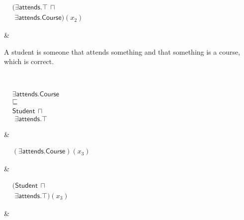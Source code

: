 \documentclass{amsart}
\newcommand\tableEntailmentSpacing{2.5cm}
\newcommand\tableExamplarSpacing{3.5cm}
\newcommand\tableCommentSpacing{4cm}
\newcommand\tableEquationIndent{4pt}
\begin{document}
\begin{table}
\begin{center}
\begin{tabular}
\begin{minipage}{\tableExamplarSpacing}
				\vspace{2pt}
				$\begin{aligned}
				&(\exists \mathsf{attends}.\top\hspace{2pt} \sqcap \\
				&\hspace{\tableEquationIndent}\exists \mathsf{attends}.\mathsf{Course})(x_2)
				\end{aligned}$ 
			\end{minipage}
			&
			\begin{minipage}{\tableCommentSpacing}
				\vspace{2pt}
				A student is someone that attends something and that something is a course, which is correct.
				\vspace{2pt}
			\end{minipage}     
			\\        
			\begin{minipage}{\tableEntailmentSpacing}
				\vspace{2pt}
				$\begin{aligned}
				&\exists \mathsf{attends}.\mathsf{Course}\\
				&\sqsubseteq\\
				&\mathsf{Student}\hspace{2pt} \sqcap \\
				&\hspace{\tableEquationIndent}\exists \mathsf{attends}.\top
				\end{aligned}$
			\end{minipage}
			&
			\begin{minipage}{\tableExamplarSpacing}
				$\begin{aligned}
				&(\exists \mathsf{attends}.\mathsf{Course})(x_3)
				\end{aligned}$
			\end{minipage}
			&
			\begin{minipage}{\tableExamplarSpacing}
				\vspace{2pt}
				$\begin{aligned}
				&(\mathsf{Student}\hspace{2pt} \sqcap \\
				&\hspace{\tableEquationIndent}\exists \mathsf{attends}.\top)(x_3)
				\end{aligned}$ 
			\end{minipage}
			&
			\begin{minipage}{\tableCommentSpacing}
				\vspace{2pt}

\end{minipage}
\end{tabular}
\end{center}
\end{table}
\end{document}
